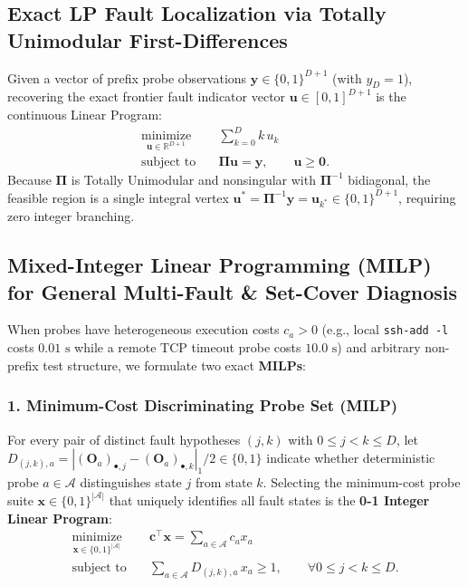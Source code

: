 \documentclass[11pt,a4paper]{article}
\theoremstyle{definition}
\theoremstyle{remark}
\begin{document}
\subsection{Exact LP Fault Localization via Totally Unimodular First-Differences}

Given a vector of prefix probe observations $\bm{y} \in \{0,1\}^{D+1}$ (with $y_D = 1$), recovering the exact frontier fault indicator vector $\bm{u} \in [0,1]^{D+1}$ is the continuous Linear Program:
\begin{align}
    \underset{\bm{u} \in \mathbb{R}^{D+1}}{\text{minimize}} \quad & \sum_{k=0}^{D} k \, u_k \\
    \text{subject to} \quad & \mathbf{\Pi} \bm{u} = \bm{y}, \qquad \bm{u} \ge \bm{0}.
\end{align}
Because $\mathbf{\Pi}$ is Totally Unimodular and nonsingular with $\mathbf{\Pi}^{-1}$ bidiagonal, the feasible region is a single integral vertex $\bm{u}^* = \mathbf{\Pi}^{-1}\bm{y} = \bm{u}_{k^*} \in \{0,1\}^{D+1}$, requiring zero integer branching.

\subsection{Mixed-Integer Linear Programming (MILP) for General Multi-Fault \& Set-Cover Diagnosis}

When probes have heterogeneous execution costs $c_a > 0$ (e.g., local \texttt{ssh-add -l} costs $0.01\text{ s}$ while a remote TCP timeout probe costs $10.0\text{ s}$) and arbitrary non-prefix test structure, we formulate two exact \textbf{MILPs}:

\subsubsection*{1. Minimum-Cost Discriminating Probe Set (MILP)}
For every pair of distinct fault hypotheses $(j, k)$ with $0 \le j < k \le D$, let $D_{(j,k), a} = |(\mathbf{O}_a)_{\bullet, j} - (\mathbf{O}_a)_{\bullet, k}|_1 / 2 \in \{0, 1\}$ indicate whether deterministic probe $a \in \mathcal{A}$ distinguishes state $j$ from state $k$. Selecting the minimum-cost probe suite $\bm{x} \in \{0,1\}^{|\mathcal{A}|}$ that uniquely identifies all fault states is the \textbf{0-1 Integer Linear Program}:
\begin{align}
    \underset{\bm{x} \in \{0,1\}^{|\mathcal{A}|}}{\text{minimize}} \quad & \bm{c}^\top \bm{x} = \sum_{a \in \mathcal{A}} c_a x_a \\
    \text{subject to} \quad & \sum_{a \in \mathcal{A}} D_{(j,k), a} \, x_a \ge 1, \qquad \forall 0 \le j < k \le D.
\end{align}
\end{document}
